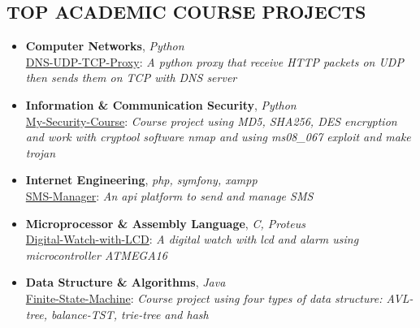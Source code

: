 \documentclass[margin]{res}
\begin{document}
\begin{resume}

\section{TOP ACADEMIC COURSE PROJECTS}

\begin{itemize} \itemsep +3pt

\item \textbf{Computer Networks}, {\sl Python}\\
\href{https://github.com/aliyazdi75/DNS-UDP-TCP-Proxy}{DNS-UDP-TCP-Proxy}: \textit{A python proxy that receive HTTP packets on UDP then sends them on TCP with DNS server}

\item \textbf{Information \& Communication Security}, {\sl Python}\\
\href{https://github.com/aliyazdi75/My-Security-Course}{My-Security-Course}: \textit{Course project using MD5, SHA256, DES encryption and work with cryptool software nmap and using ms08\_067 exploit and make trojan}

\item \textbf{Internet Engineering}, {\sl php, symfony, xampp}\\
\href{https://github.com/aliyazdi75/sms-manager}{SMS-Manager}: \textit{An api platform to send and manage SMS}

\item \textbf{Microprocessor \& Assembly Language}, {\sl C, Proteus}\\
\href{https://github.com/aliyazdi75/Digital-Watch-with-LCD}{Digital-Watch-with-LCD}: \textit{A digital watch with lcd and alarm using microcontroller ATMEGA16}



\item \textbf{Data Structure \& Algorithms}, {\sl Java}\\
\href{https://github.com/aliyazdi75/Finite-State-Machine}{Finite-State-Machine}: \textit{Course project using four types of data structure: AVL-tree, balance-TST, trie-tree and hash}


\end{itemize}
\end{resume}
\end{document}
